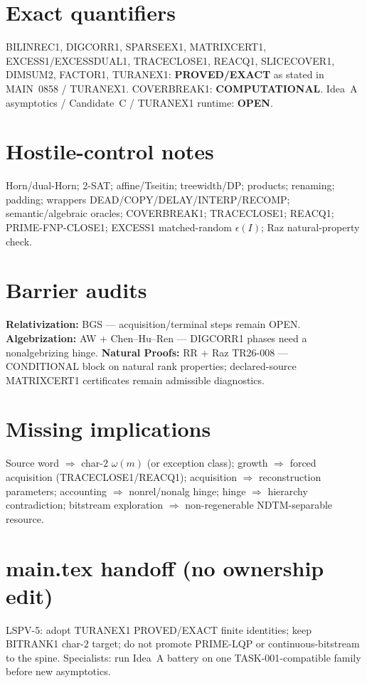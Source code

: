 \documentclass[11pt]{article}
\begin{document}
\section*{Exact quantifiers}
BILINREC1, DIGCORR1, SPARSEEX1, MATRIXCERT1, EXCESS1/EXCESSDUAL1, TRACECLOSE1, REACQ1,
SLICECOVER1, DIMSUM2, FACTOR1, TURANEX1: \textbf{PROVED/EXACT} as stated in MAIN~0858 /
TURANEX1. COVERBREAK1: \textbf{COMPUTATIONAL}. Idea~A asymptotics / Candidate~C /
TURANEX1 runtime: \textbf{OPEN}.

\section*{Hostile-control notes}
Horn/dual-Horn; 2-SAT; affine/Tseitin; treewidth/DP; products; renaming; padding; wrappers
DEAD/COPY/DELAY/INTERP/RECOMP; semantic/algebraic oracles; COVERBREAK1; TRACECLOSE1;
REACQ1; PRIME-FNP-CLOSE1; EXCESS1 matched-random $\epsilon(I)$; Raz natural-property check.

\section*{Barrier audits}
\textbf{Relativization:} BGS --- acquisition/terminal steps remain OPEN.
\textbf{Algebrization:} AW + Chen--Hu--Ren --- DIGCORR1 phases need a nonalgebrizing hinge.
\textbf{Natural Proofs:} RR + Raz TR26-008 --- CONDITIONAL block on natural rank properties;
declared-source MATRIXCERT1 certificates remain admissible diagnostics.

\section*{Missing implications}
Source word $\Rightarrow$ char-$2$ $\omega(m)$ (or exception class);
growth $\Rightarrow$ forced acquisition (TRACECLOSE1/REACQ1);
acquisition $\Rightarrow$ reconstruction parameters;
accounting $\Rightarrow$ nonrel/nonalg hinge;
hinge $\Rightarrow$ hierarchy contradiction;
bitstream exploration $\Rightarrow$ non-regenerable NDTM-separable resource.

\section*{main.tex handoff (no ownership edit)}
LSPV-5: adopt TURANEX1 PROVED/EXACT finite identities; keep BITRANK1 char-$2$ target;
do not promote PRIME-LQP or continuous-bitstream to the spine. Specialists: run Idea~A
battery on one TASK-001-compatible family before new asymptotics.
\end{document}
